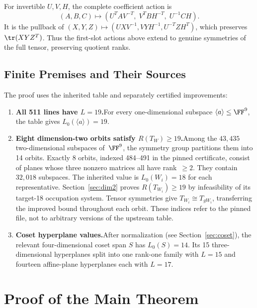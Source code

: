 \documentclass[11pt,a4paper]{article}
\begin{document}
For invertible $U,V,H$, the complete coefficient action is
\begin{equation}\label{eq:coefficient-action}
 (A,B,C)\longmapsto
 (U^TAV^{-T},\;V^TBH^{-T},\;U^{-1}CH).
\end{equation}
It is the pullback of $(X,Y,Z)\mapsto(UXV^{-1},VYH^{-1},U^{-T}ZH^T)$,
which preserves $\tr(XYZ^T)$. Thus the first-slot actions above extend
to genuine symmetries of the full tensor, preserving quotient ranks.

\subsection{Finite Premises and Their Sources}

The proof uses the inherited table and separately certified improvements:

\begin{enumerate}[label=(\roman*)]
  \item\label{it:lines} \textbf{All 511 lines have $L=19$.}\quad For every one-dimensional subspace $\langle a\rangle\le\FF^9$, the table gives $L_0(\langle a\rangle)=19$.

  \item\label{it:dim2} \textbf{Eight dimension-two orbits satisfy $R(T_W)\ge19$.}\quad Among the $43{,}435$ two-dimensional subspaces of~$\FF^9$, the symmetry group partitions them into 14 orbits. Exactly 8 orbits, indexed 484--491 in the pinned certificate, consist of planes whose three nonzero matrices all have rank~$\ge2$. They contain $32{,}018$ subspaces. The inherited value is $L_0(W_i)=18$ for each representative. Section~\ref{sec:dim2} proves $R(T_{W_i})\ge19$ by infeasibility of its target-18 occupation system. Tensor symmetries give $T_{W_i}\cong T_{gW_i}$, transferring the improved bound throughout each orbit. These indices refer to the pinned file, not to arbitrary versions of the upstream table.

  \item\label{it:coset} \textbf{Coset hyperplane values.}\quad After normalization (see Section~\ref{sec:coset}), the relevant four-dimensional coset span $S$ has $L_0(S)=14$.  Its 15 three-dimensional hyperplanes split into one rank-one family with $L=15$ and fourteen affine-plane hyperplanes each with $L=17$.
\end{enumerate}


\section{Proof of the Main Theorem}\label{sec:proof}
\end{document}
